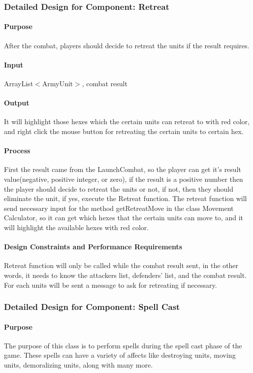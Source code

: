 \documentclass[12pt,a4paper,titlepage]{article}
\begin{document}
\subsubsection{Detailed Design for Component: Retreat}
\paragraph{Purpose} After the combat, players should decide to retreat the units if the result requires.
\paragraph{Input} ArrayList$<$ArmyUnit$>$, combat result
\paragraph{Output} It will highlight those hexes which the certain units can retreat to with red color, and right click the mouse button for retreating the certain units to certain hex.
\paragraph{Process} First the result came from the LaunchCombat, so the player can get it's result value(negative, positive integer, or zero), if the result is a positive number then the player should decide to retreat the units or not, if not, then they should eliminate the unit, if yes, execute the Retreat function. The retreat function will send necessary input for the method getRetreatMove in the class Movement Calculator, so it can get which hexes that the certain units can move to, and it will highlight the available hexes with red color.
\paragraph{Design Constraints and Performance Requirements} Retreat function will only be called while the combat result sent, in the other words, it needs to know the attackers list, defenders' list, and the combat result. For each units will be sent a message to ask for retreating if necessary.

\subsubsection{Detailed Design for Component: Spell Cast}
\paragraph{Purpose} The purpose of this class is to perform spells during the spell cast phase of the game.  These spells can have a variety of affects like destroying units, moving units, demoralizing units, along with many more.  
\end{document}
